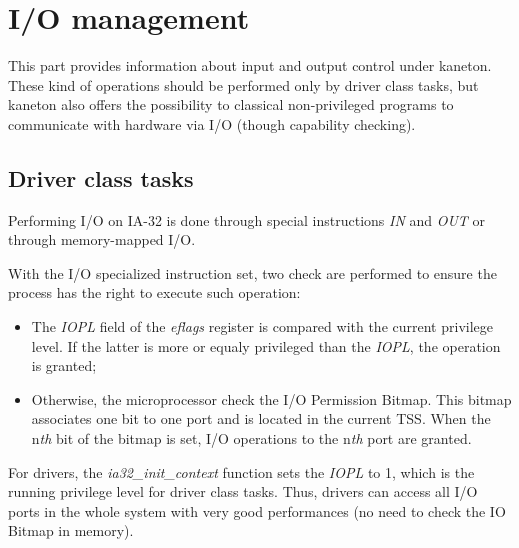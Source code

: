 %
%
%
%
%
%

%
%

\chapter{I/O management}

This part provides information about input and output control under
kaneton. These kind of operations should be performed only by driver
class tasks, but kaneton also offers the possibility to classical
non-privileged programs to communicate with hardware via I/O (though
capability checking).

\newpage

%
%

\section{Driver class tasks}

Performing I/O on IA-32 is done through special instructions
\textit{IN} and \textit{OUT} or through memory-mapped I/O.

With the I/O specialized instruction set, two check are performed to
ensure the process has the right to execute such operation:

\begin{itemize}
\item
  The \textit{IOPL} field of the \textit{eflags} register is compared
  with the current privilege level. If the latter is more or equaly
  privileged than the \textit{IOPL}, the operation is granted;
\item
  Otherwise, the microprocessor check the I/O Permission Bitmap. This
  bitmap associates one bit to one port and is located in the current
  TSS. When the n\textit{th} bit of the bitmap is set, I/O operations
  to the n\textit{th} port are granted.
\end{itemize}

For drivers, the \textit{ia32\_init\_context} function sets the
\textit{IOPL} to 1, which is the running privilege level for driver
class tasks. Thus, drivers can access all I/O ports in the whole
system with very good performances (no need to check the IO Bitmap in
memory).

